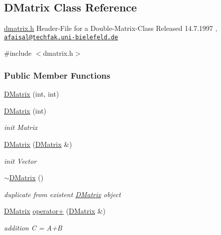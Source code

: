 \subsection{DMatrix Class Reference}
\label{class_d_matrix}


\hyperlink{dmatrix_8h}{dmatrix.h} Header-\/File for a Double-\/Matrix-\/Class Released 14.7.1997 , \href{mailto:afaisal@techfak.uni-bielefeld.de}{\tt afaisal@techfak.uni-\/bielefeld.de}  




{\ttfamily \#include $<$dmatrix.h$>$}

\subsubsection*{Public Member Functions}
\begin{DoxyCompactItemize}
\item 
\hyperlink{class_d_matrix_ae4b5fb249b94e29a5fae797dbfb1297d}{DMatrix} (int, int)
\item 
\hyperlink{class_d_matrix_a07d7f66c3f2271df927c6c724616ff5b}{DMatrix} (int)
\begin{DoxyCompactList}\small\item\em init Matrix \item\end{DoxyCompactList}\item 
\hyperlink{class_d_matrix_a56605fe6d6d0243d874a7650171d3ba0}{DMatrix} (\hyperlink{class_d_matrix}{DMatrix} \&)
\begin{DoxyCompactList}\small\item\em init Vector \item\end{DoxyCompactList}\item 
\hyperlink{class_d_matrix_a06129166d2e2166192f1f35841d1c0e5}{$\sim$DMatrix} ()
\begin{DoxyCompactList}\small\item\em duplicate from existent \hyperlink{class_d_matrix}{DMatrix} object \item\end{DoxyCompactList}\item 
\hyperlink{class_d_matrix}{DMatrix} \hyperlink{class_d_matrix_ac6395616b3ff717a6740b5fc57f00e75}{operator+} (\hyperlink{class_d_matrix}{DMatrix} \&)
\begin{DoxyCompactList}\small\item\em addition C = A+B \item\end{DoxyCompactList}\item 

\end{DoxyCompactItemize}
